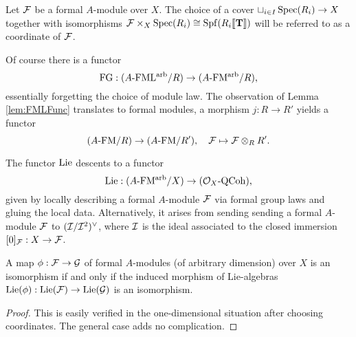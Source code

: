 \documentclass[../main.tex]{subfiles}
\begin{document}
\begin{defi}[Coordinate]
  Let $\mathcal{F}$ be a formal $A$-module over $X$. The choice of a cover $\sqcup_{i
  \in I} \operatorname{Spec}(R_i) \to X$ together with isomorphisms $\mathcal{F} \times_X \operatorname{Spec}(R_i)
  \cong \operatorname{Spf}(R_i\llbracket \mathbf{T} \rrbracket)$ will be referred to as a coordinate of $\mathcal{F}$. 
\end{defi}

Of course there is a functor 
\begin{equation*}
  \textnormal{FG}: {({A}\text-\allowbreak\mathrm{FML^{arb}}/{R})} \to {({A}\text-\allowbreak\mathrm{FM^{arb}}/{R})},
\end{equation*}
essentially forgetting the choice of module law. The observation of Lemma 
\ref{lem:FMLFunc} translates to formal modules, a morphism $j : R \to R'$ 
yields a functor 
\begin{equation*} 
  {({A}\text-\allowbreak\mathrm{FM}/{R})} \to {({A}\text-\allowbreak\mathrm{FM}/{R'})}, \quad \mathcal{F} \mapsto \mathcal{F} \otimes_R R'.
\end{equation*}

\begin{defi}
  The functor $\operatorname{Lie}$ descents to a functor 
  \begin{equation*}
    \operatorname{Lie}: {({A}\text-\allowbreak\mathrm{FM^{arb}}/{X})} \to {({\mathcal{O}_X}\text-\allowbreak\mathrm{QCoh})}, 
  \end{equation*}
  given by locally describing a formal $A$-module $\mathcal{F}$ via formal group laws
  and gluing the local data. Alternatively, it arises from sending 
  sending a formal $A$-module $\mathcal{F}$ to $(\mathcal{I} / \mathcal{I}^2)^\vee$, where $\mathcal{I}$ is the
  ideal associated to the closed immersion $[0]_{\mathcal{F}}: X \to \mathcal{F}$. 
\end{defi}

\begin{lem}\label{lem:IsosCheckOnLie}
  A map $\phi: \mathcal{F} \to \mathcal{G}$ of formal $A$-modules (of arbitrary dimension) over
  $X$ is an isomorphism if and only if the induced
  morphism of Lie-algebras $\operatorname{Lie}(\phi): \operatorname{Lie}(\mathcal{F}) \to \operatorname{Lie}(\mathcal{G})$ is an isomorphism.
\begin{proof}
  This is easily verified in the one-dimensional situation after choosing coordinates.
  The general case adds no complication. 
\end{proof}
\end{lem}
\end{document}
